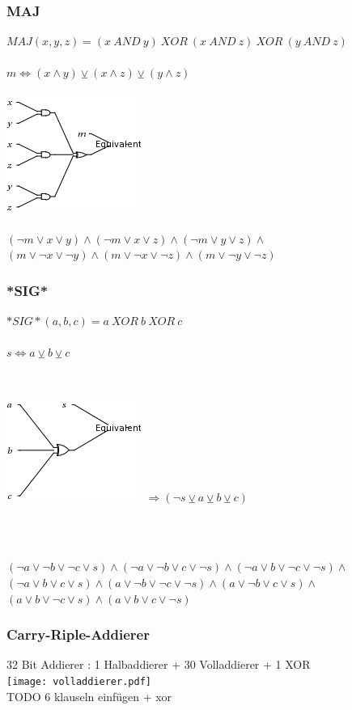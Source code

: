\documentclass{beamer}
\begin{document}
    \begin{frame}
      \frametitle{MAJ}
      $ MAJ( x, y, z) = (x~AND~y)~XOR~(x~AND~z)~XOR~(y~AND~z) $\\
      ~\\
      $ m \Leftrightarrow (x \wedge y) \veebar (x \wedge z) \veebar (y \wedge z) $\\
      ~\\
      \includegraphics[scale=0.5]{maj.png}\\
      ~\\
      $ (\neg m \vee x \vee y) \wedge  (\neg m \vee x \vee z) \wedge (\neg m \vee y \vee z) \wedge $\\
      $ (m \vee \neg x \vee \neg y) \wedge (m \vee \neg x \vee \neg z) \wedge (m \vee \neg y \vee \neg z) $
      \end{frame}
    \begin{frame}
      \frametitle{*SIG*}
      $ *SIG*(a, b, c) = a~XOR~b~XOR~c $\\
      ~\\
      $ s \Leftrightarrow a \veebar b \veebar c $\\
      ~\\      
      \begin{columns}[C]
        \includegraphics[scale=0.5]{sig.png}
        $ \Rightarrow (\neg s \veebar a \veebar b \veebar c) $
      \end{columns}
      ~\\
      ~\\
      $ (\neg a \vee \neg b \vee \neg c \vee s) \wedge (\neg a \vee \neg b \vee c \vee \neg s) \wedge (\neg a \vee b \vee \neg c \vee \neg s) \wedge$\\
      $ (\neg a \vee b \vee c \vee s) \wedge (a \vee \neg b \vee \neg c \vee \neg s) \wedge (a \vee \neg b \vee c \vee s) \wedge $\\
      $ (a \vee b \vee \neg c \vee s) \wedge (a \vee b \vee c \vee \neg s) $
    \end{frame}
    \begin{frame}
      \frametitle{Carry-Riple-Addierer}
      32 Bit Addierer : 1 Halbaddierer + 30 Volladdierer + 1 XOR\\
      \texttt{[image: volladdierer.pdf]}\\
      TODO 6 klauseln einfügen + xor
    \end{frame}
\end{document}
